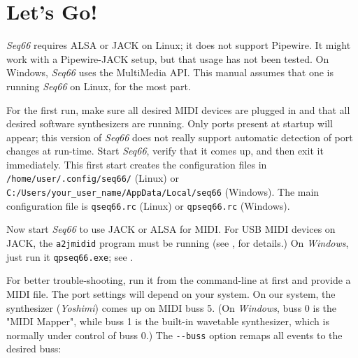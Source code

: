%
%
%

\section{Let's Go!}
\label{sec:introduction_lets_go}

   \textsl{Seq66} requires ALSA or JACK on Linux;
   it does not support
   Pipewire.
   It might work with a Pipewire-JACK setup, but that usage has not been
   tested.
   On Windows, \textsl{Seq66} uses the MultiMedia API.
   This manual assumes that one is running \textsl{Seq66} on Linux, for the most
   part.

   For the first run, make sure all desired MIDI devices are plugged in and
   that all desired software synthesizers are running.
   Only ports present at startup will appear; this version of
   \textsl{Seq66} does not
   really support automatic detection of port changes at run-time.
   Start \textsl{Seq66}, verify that it comes up, and then exit it
   immediately.
   This first start creates the configuration files in
   \texttt{/home/user/.config/seq66/} (Linux) or
   \texttt{C:/Users/your\_user\_name/AppData/Local/seq66} (Windows).
   The main configuration file is
   \texttt{qseq66.rc} (Linux) or
   \texttt{qpseq66.rc} (Windows).

   Now start \textsl{Seq66} to use JACK or ALSA for MIDI.
   For USB MIDI devices on JACK, the \texttt{a2jmidid} program must be running
   (see , for details.)
   On \textsl{Windows}, just run it \texttt{qpseq66.exe};
   see .

   For better trouble-shooting, run it from the command-line at first and
   provide a MIDI file.
   The port settings will depend on your system.
   On our system, the synthesizer (\textsl{Yoshimi}) comes up on MIDI buss 5.
   (On \textsl{Windows}, buss 0 is the "MIDI Mapper", while buss 1 is the
   built-in wavetable synthesizer, which is normally under control of buss 0.)
   The \texttt{-{}-buss} option remaps all events to the desired buss:

